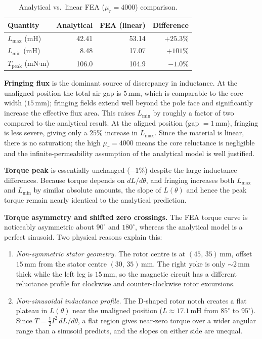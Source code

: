 \documentclass[12pt,a4paper]{article}
\newcommand{\unit}[1]{\,\mathrm{#1}}
\begin{document}
\begin{table}[H]
  \centering
  \caption{Analytical vs.\ linear FEA ($\mu_r = 4000$) comparison.}
  \label{tab:comparison}
  \renewcommand{\arraystretch}{1.3}
  \begin{tabular}{|l|r|r|r|}
    \hline
    \textbf{Quantity} & \textbf{Analytical} & \textbf{FEA (linear)} & \textbf{Difference} \\
    \hline
    $L_{\max}$ (mH)                   & 42.41 & 53.14 & $+25.3\%$ \\
    $L_{\min}$ (mH)                   &  8.48 & 17.07 & $+101\%$  \\
    $T_{\mathrm{peak}}$ (mN$\cdot$m)  & 106.0 & 104.9 & $-1.0\%$  \\
    \hline
  \end{tabular}
\end{table}

\textbf{Fringing flux} is the dominant source of discrepancy in
inductance.  At the unaligned position the total air gap is
$5\unit{mm}$, which is comparable to the core width ($15\unit{mm}$);
fringing fields extend well beyond the pole face and significantly
increase the effective flux area.  This raises $L_{\min}$ by roughly a
factor of two compared to the analytical result.  At the aligned
position (gap $= 1\unit{mm}$), fringing is less severe, giving only a
$25\%$ increase in $L_{\max}$.  Since the material is linear, there is
no saturation; the high $\mu_r = 4000$ means the core reluctance is
negligible and the infinite-permeability assumption of the analytical
model is well justified.

\textbf{Torque peak} is essentially unchanged ($-1\%$) despite the
large inductance differences.  Because torque depends on $dL/d\theta$,
and fringing increases both $L_{\max}$ and $L_{\min}$ by similar
absolute amounts, the slope of $L(\theta)$ and hence the peak torque
remain nearly identical to the analytical prediction.

\textbf{Torque asymmetry and shifted zero crossings.}
The FEA torque curve is noticeably asymmetric about $90^{\circ}$ and
$180^{\circ}$, whereas the analytical model is a perfect sinusoid.
Two physical reasons explain this:

\begin{enumerate}
  \item \emph{Non-symmetric stator geometry.} The rotor centre is at
        $(45,\,35)\unit{mm}$, offset $15\unit{mm}$ from the stator
        centre $(30,\,35)\unit{mm}$.  The right yoke is only
        $\sim 2\unit{mm}$ thick while the left leg is $15\unit{mm}$,
        so the magnetic circuit has a different reluctance profile for
        clockwise and counter-clockwise rotor excursions.

  \item \emph{Non-sinusoidal inductance profile.} The D-shaped rotor
        notch creates a flat plateau in $L(\theta)$ near the unaligned
        position ($L \approx 17.1\unit{mH}$ from $85^{\circ}$ to
        $95^{\circ}$).  Since $T = \tfrac{1}{2}I^2\,dL/d\theta$, a flat
        region gives near-zero torque over a wider angular range than a
        sinusoid predicts, and the slopes on either side are unequal.
\end{enumerate}
\end{document}
